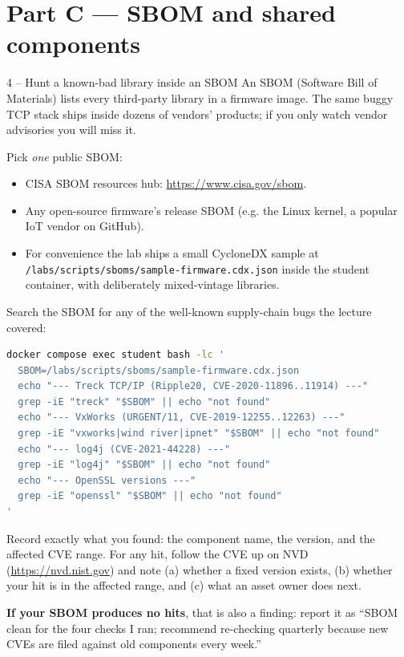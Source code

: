 \documentclass[11pt,a4paper]{article}
\begin{document}
\section*{Part C --- SBOM and shared components}

\begin{stepbox}{4 -- Hunt a known-bad library inside an SBOM}
An SBOM (Software Bill of Materials) lists every third-party library in a firmware image. The same buggy TCP stack ships inside dozens of vendors' products; if you only watch vendor advisories you will miss it.

Pick \emph{one} public SBOM:
\begin{itemize}\setlength{\itemsep}{1pt}
  \item CISA SBOM resources hub: \url{https://www.cisa.gov/sbom}.
  \item Any open-source firmware's release SBOM (e.g. the Linux kernel, a popular IoT vendor on GitHub).
  \item For convenience the lab ships a small CycloneDX sample at \texttt{/labs/scripts/sboms/sample-firmware.cdx.json} inside the student container, with deliberately mixed-vintage libraries.
\end{itemize}

Search the SBOM for any of the well-known supply-chain bugs the lecture covered:

\begin{lstlisting}[language=bash]
docker compose exec student bash -lc '
  SBOM=/labs/scripts/sboms/sample-firmware.cdx.json
  echo "--- Treck TCP/IP (Ripple20, CVE-2020-11896..11914) ---"
  grep -iE "treck" "$SBOM" || echo "not found"
  echo "--- VxWorks (URGENT/11, CVE-2019-12255..12263) ---"
  grep -iE "vxworks|wind river|ipnet" "$SBOM" || echo "not found"
  echo "--- log4j (CVE-2021-44228) ---"
  grep -iE "log4j" "$SBOM" || echo "not found"
  echo "--- OpenSSL versions ---"
  grep -iE "openssl" "$SBOM" || echo "not found"
'
\end{lstlisting}

Record exactly what you found: the component name, the version, and the affected CVE range. For any hit, follow the CVE up on NVD (\url{https://nvd.nist.gov}) and note (a) whether a fixed version exists, (b) whether your hit is in the affected range, and (c) what an asset owner does next.

\textbf{If your SBOM produces no hits}, that is also a finding: report it as ``SBOM clean for the four checks I ran; recommend re-checking quarterly because new CVEs are filed against old components every week.''
\end{stepbox}
\end{document}
